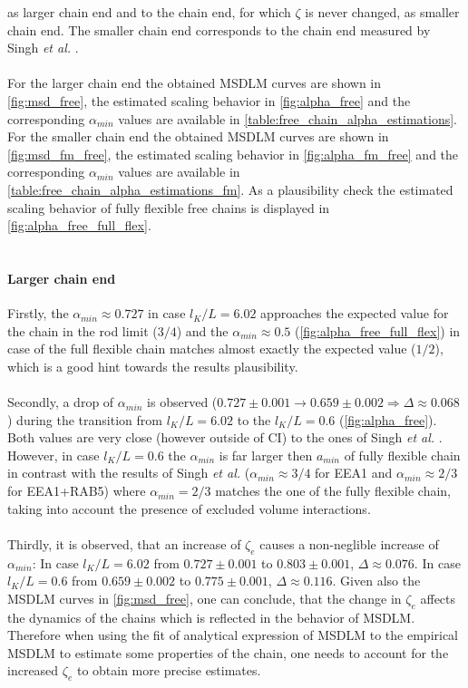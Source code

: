 \documentclass[
    paper=A4,pagesize=automedia,fontsize=12pt,
    BCOR=15mm,DIV=22,
    twoside,headinclude,footinclude=false,
    fleqn,             %
    bibliography=totocnumbered,          %
    listof=totoc,                %
    listof=flat,                 %
    cleardoublepage=empty      %
    numbers=endperiod
]{scrartcl}
\begin{document}
as larger chain end and to the chain end, for which $\zeta$ is never changed, as 
smaller chain end. The smaller chain end corresponds to the 
chain end measured by Singh \emph{et al.} \cite{Singh:2022}.
\\
\\
For the larger chain end the obtained MSDLM curves are shown in 
\autoref{fig:msd_free}, the estimated scaling 
behavior in \autoref{fig:alpha_free} and the 
corresponding $\alpha_{min}$ values are available in 
\autoref{table:free_chain_alpha_estimations}.
For the smaller chain end the obtained MSDLM curves are shown in 
\autoref{fig:msd_fm_free}, the estimated scaling 
behavior in \autoref{fig:alpha_fm_free} and the 
corresponding $\alpha_{min}$ values are available in 
\autoref{table:free_chain_alpha_estimations_fm}.
As a plausibility check the estimated scaling behavior of fully flexible free chains is
displayed in \autoref{fig:alpha_free_full_flex}. 
\\
\\
\paragraph{Larger chain end}
Firstly, the $\alpha_{min} \approx 0.727$
in case $l_K/L=6.02$ approaches the expected value for the chain in the rod limit ($3/4$) 
and the $\alpha_{min} \approx 0.5$ (\autoref{fig:alpha_free_full_flex}) in 
case of the full flexible chain matches almost exactly the expected value 
($1/2$), which is a good hint towards the results plausibility.
\\
\\
Secondly, a drop of $\alpha_{min}$ is observed 
($0.727\pm0.001 \rightarrow 0.659\pm0.002 \Rightarrow \Delta\approx0.068$) during the
transition from $l_K/L=6.02$ to the $l_K/L=0.6$ (\autoref{fig:alpha_free}). 
Both values are very close (however outside of CI) to the ones
of Singh \emph{et al.} \cite{Singh:2022}.
However, in case $l_K/L=0.6$ the $\alpha_{min}$ is 
far larger then $a_{min}$ of fully flexible chain in contrast with the results
of Singh \emph{et al.} \cite{Singh:2022} ($\alpha_{min} \approx 3/4$ for EEA1 and 
$\alpha_{min} \approx 2/3$ for EEA1+RAB5) 
where $\alpha_{min}=2/3$ matches 
the one of the fully flexible chain, taking into account the presence of 
excluded volume interactions.
\\
\\
Thirdly, it is observed, that an
increase of $\zeta_e$ causes a non-neglible increase of $\alpha_{min}$:
In case $l_K/L=6.02$ from $0.727 \pm 0.001$ to $0.803 \pm 0.001$, $\Delta\approx0.076$.
In case $l_K/L=0.6$ from $0.659 \pm 0.002$ to $0.775 \pm 0.001$, $\Delta\approx0.116$.
Given also the MSDLM curves in \autoref{fig:msd_free}, one can conclude,
that the change in $\zeta_e$ affects the dynamics of the chains which is reflected in
the behavior of MSDLM. Therefore when using the fit of analytical expression of MSDLM
to the empirical MSDLM to estimate some properties of the chain, one needs to account
for the increased $\zeta_e$ to obtain more precise estimates.
\end{document}
